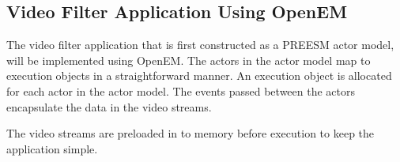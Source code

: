 \subsection{Video Filter Application Using OpenEM}
The video filter application that is first constructed as a PREESM actor model, will be implemented using OpenEM. The actors in the actor model map to execution objects in a straightforward manner. An execution object is allocated for each actor in the actor model. The events passed between the actors encapsulate the data in the video streams.

The video streams are preloaded in to memory before execution to keep the application simple.